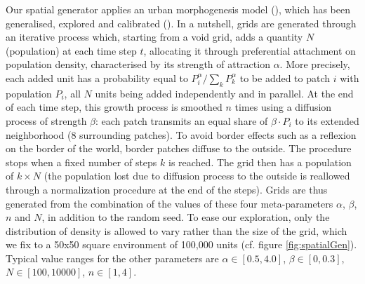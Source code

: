 \documentclass[Royal,sageh,times]{sagej}
\begin{document}
Our spatial generator applies an urban morphogenesis model (\cite{Batty2007}), which has been generalised, explored and calibrated (\cite{Raimbault2014}). In a nutshell, grids are generated through an iterative process which, starting from a void grid, adds a quantity $N$ (population) at each time step $t$, allocating it through preferential attachment on population density, characterised by its strength of attraction $\alpha$. More precisely, each added unit has a probability equal to $P_i^{\alpha}/\sum_k P_k^{\alpha}$ to be added to patch $i$ with population $P_i$, all $N$ units being added independently and in parallel. At the end of each time step, this growth process is smoothed $n$ times using a diffusion process of strength $\beta$: each patch transmits an equal share of $\beta\cdot P_i$ to its extended neighborhood (8 surrounding patches). To avoid border effects such as a reflexion on the border of the world, border patches diffuse to the outside. The procedure stops when a fixed number of steps $k$ is reached. The grid then has a population of $k \times N$ (the population lost due to diffusion process to the outside is reallowed through a normalization procedure at the end of the steps). Grids are thus generated from the combination of the values of these four meta-parameters $\alpha$, $\beta$, $n$ and $N$, in addition to the random seed. To ease our exploration, only the distribution of density is allowed to vary rather than the size of the grid, which we fix to a 50x50 square environment of 100,000 units (cf. figure \ref{fig:spatialGen}). Typical value ranges for the other parameters are $\alpha\in\left[0.5,4.0\right]$, $\beta \in\left[0,0.3\right] $, $N\in \left[100,10000\right]$, $n\in\left[1,4\right]$.
 
\end{document}
